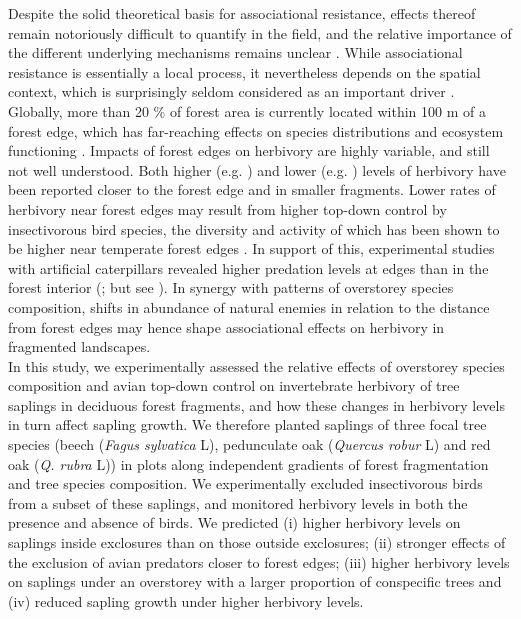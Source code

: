 \documentclass[10pt, twoside]{book} %
\begin{document}
	Despite the solid theoretical basis for associational resistance, effects thereof remain notoriously difficult to quantify in the field, and the relative importance of the different underlying mechanisms remains unclear \citep{Barbosa2009, Grossman2018, Muiruri2016}. While associational resistance is essentially a local process, it nevertheless depends on the spatial context, which is surprisingly seldom considered as an important driver \citep{Nadrowski2010}. Globally, more than 20 \% of forest area is currently located within 100 m of a forest edge, which has far-reaching effects on species distributions and ecosystem functioning \citep{Haddad2015, Pfeifer2017}. Impacts of forest edges on herbivory are highly variable, and still not well understood. Both higher (e.g. \citealt{Castagneyrol2019, Terborgh2006}) and lower (e.g. \citealt{Ruiz-Guerra2010, Simonetti2007}) levels of herbivory have been reported closer to the forest edge and in smaller fragments. Lower rates of herbivory near forest edges may result from higher top-down control by insectivorous bird species, the diversity and activity of which has been shown to be higher near temperate forest edges \citep{Hofmeister2017, Melin2018, Terraube2016}. In support of this, experimental studies with artificial caterpillars revealed higher predation levels at edges than in the forest interior (\citealt{Barbaro2014, Gonzalez-Gomez2006}; but see \citealt{Peter2015}). In synergy with patterns of overstorey species composition, shifts in abundance of natural enemies in relation to the distance from forest edges may hence shape associational effects on herbivory in fragmented landscapes.\\
	
	In this study, we experimentally assessed the relative effects of overstorey species composition and avian top-down control on invertebrate herbivory of tree saplings in deciduous forest fragments, and how these changes in herbivory levels in turn affect sapling growth. We therefore planted saplings of three focal tree species (beech (\textit{Fagus sylvatica} L), pedunculate oak (\textit{Quercus robur} L) and red oak (\textit{Q. rubra} L)) in plots along independent gradients of forest fragmentation and tree species composition. We experimentally excluded insectivorous birds from a subset of these saplings, and monitored herbivory levels in both the presence and absence of birds. We predicted (i) higher herbivory levels on saplings inside exclosures than on those outside exclosures; (ii) stronger effects of the exclusion of avian predators closer to forest edges; (iii) higher herbivory levels on saplings under an overstorey with a larger proportion of conspecific trees and (iv) reduced sapling growth under higher herbivory levels.
	
\end{document}
